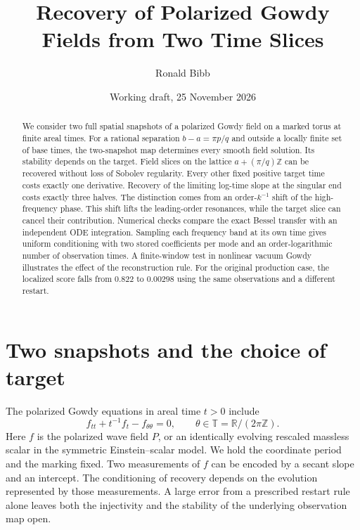 \documentclass[11pt]{article}
\title{Recovery of Polarized Gowdy Fields from Two Time Slices}
\author{Ronald Bibb}
\date{Working draft, 25 November 2026}
\newcommand{\T}{\mathbb T}
\newcommand{\Z}{\mathbb Z}
\begin{document}
\maketitle

\begin{abstract}
We consider two full spatial snapshots of a polarized Gowdy field on
a marked torus at finite areal times. For a rational separation
$b-a=\pi p/q$ and outside a locally finite set of base times, the
two-snapshot map determines every smooth field solution. Its stability
depends on the target. Field slices on the lattice $a+(\pi/q)\Z$
can be recovered without loss of Sobolev regularity. Every other fixed
positive target time costs exactly one derivative. Recovery of the limiting
log-time slope at the singular end costs exactly three halves.
The distinction comes from an order-$k^{-1}$ shift of the high-frequency
phase. This shift lifts the leading-order resonances, while the target
slice can cancel their contribution. Numerical checks compare the exact
Bessel transfer with an independent ODE integration. Sampling each
frequency band at its own time gives uniform conditioning with two
stored coefficients per mode and an order-logarithmic number of
observation times. A finite-window test in nonlinear vacuum Gowdy
illustrates the effect of the reconstruction rule. For the original
production case, the localized score falls from $0.822$ to $0.00298$
using the same observations and a different restart.
\end{abstract}

\section{Two snapshots and the choice of target}
The polarized Gowdy equations in areal time $t>0$ include
\begin{equation}
 f_{tt}+t^{-1}f_t-f_{\theta\theta}=0,\qquad \theta\in\T=\mathbb R/(2\pi\Z).
 \label{wave}
\end{equation}
Here $f$ is the polarized wave field $P$, or an identically evolving
rescaled massless scalar in the symmetric Einstein--scalar model. We hold
the coordinate period and the marking fixed. Two measurements of $f$
can be encoded by a secant slope and an intercept. The conditioning of
recovery depends on the evolution represented by those measurements.
A large error from a prescribed restart rule alone leaves both the
injectivity and the stability of the underlying observation map open.
\end{document}
